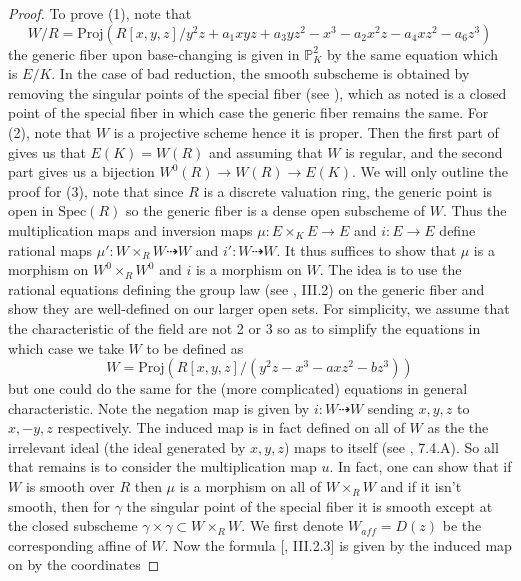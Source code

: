 \documentclass{article}
\theoremstyle{definition}
\theoremstyle{remark}
\theoremstyle{plain}
\newcommand{\mb}[1]{\mathbb{#1}}
\begin{document}
\begin{proof}
	To prove (1), note that 
	\[W/R = \text{Proj}(R[x,y,z]/y^2z + a_1xyz + a_3yz^2 - x^3 - a_2x^2z - a_4xz^2 - a_6z^3)\]
	the generic fiber upon base-changing is given in $\mb{P}^2_K$ by the same equation which is $E/K$.
	In the case of bad reduction, the smooth subscheme is obtained by removing the singular points of the special fiber (see ), which as noted is a closed point of the special fiber in which case the generic fiber remains the same.\newline
	\indent For (2), note that $W$ is a projective scheme hence it is proper.
	Then the first part of  gives us that $E(K) = W(R)$ and assuming that $W$ is regular, and the second part gives us a bijection $W^0(R) \to W(R) \to E(K)$. \newline
	\indent We will only outline the proof for (3), note that since $R$ is a discrete valuation ring, the generic point is open in $\text{Spec}(R)$ so the generic fiber is a dense open subscheme of $W$.
	Thus the multiplication maps and inversion maps  $\mu: E \times_K E \to E$ and $i: E \to E$ define rational maps $\mu': W \times_R W \dashrightarrow W$ and $i': W \dashrightarrow W$.
	It thus suffices to show that $\mu$ is a morphism on $W^0 \times_R W^0$ and $i$ is a morphism on $W$. \newline
	\indent The idea is to use the rational equations defining the group law (see \cite{AEC1}, III.2) on the generic fiber and show they are well-defined on our larger open sets.
	For simplicity, we assume that the characteristic of the field are not 2 or 3 so as to simplify the equations in which case we take $W$ to be defined as 
	\[W = \text{Proj}(R[x,y,z]/(y^2z - x^3 - axz^2 - bz^3))\]
	but one could do the same for the (more complicated) equations in general characteristic.
	Note the negation map is given by $i: W \dashrightarrow W$ sending $x,y,z$ to $x,-y,z$ respectively.
	The induced map is in fact defined on all of $W$ as the the irrelevant ideal (the ideal generated by $x,y,z$) maps to itself (see \cite{FOAG}, 7.4.A).
So all that remains is to consider the multiplication map $u$.	
In fact, one can show that if $W$ is smooth over $R$ then $\mu$ is a morphism on all of $W \times_R W$ and if it isn't smooth, then for $\gamma$ the singular point of the special fiber it is smooth except at the closed subscheme $\gamma \times \gamma \subset W \times_R W$.
We first denote $W_{aff} = D(z)$ be the corresponding affine of $W$.
Now the formula [\cite{AEC1}, III.2.3] is given by the induced map on by the coordinates  

\end{proof}
\end{document}
